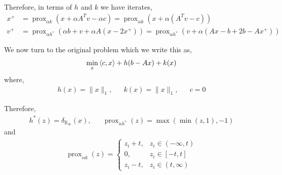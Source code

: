 \documentclass[10pt]{article}
\begin{document}
\begin{solution}[Solution]
Therefore, in terms of \( h \) and \( k \) we have iterates,
\begin{align*}
    x^+ &= \operatorname{prox}_{\alpha k}(x+\alpha A^Tv-\alpha c) 
    = \operatorname{prox}_{\alpha k}(x+\alpha(A^Tv-c))
    \\ v^+ &= \operatorname{prox}_{\alpha h^*}(\alpha b+v+\alpha A(x-2 x^+))
    = \operatorname{prox}_{\alpha h^*}(v + \alpha(Ax-b + 2b-Ax^+))
\end{align*}

We now turn to the original problem which we write this as,
\begin{align*}
    \min_x \left\langle c,x \right\rangle + h(b-Ax) + k(x) 
\end{align*}
where,
\begin{align*}
    h(x) = \| x \|_1
    ,&&
    k(x) = \| x \|_1
    ,&&
    c=0
\end{align*}

Therefore,
\begin{align*}
    h^*(z) = \delta_{\mathbb{B}_\infty}(x)
    ,&&
    \operatorname{prox}_{\alpha h^*}(z) = \max(\min(z,1),-1)
\end{align*}
and
\begin{align*}
    \operatorname{prox}_{\alpha k}(z) = 
     \begin{cases}
        z_i+t, & z_i \in (-\infty,t) \\
        0, & z_i \in [-t,t] \\
        z_i-t, & z_i \in (t,\infty)
    \end{cases}
\end{align*}

\end{solution}
\end{document}
